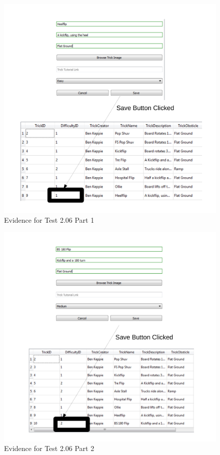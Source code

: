 \begin{figure}[H]
    \includegraphics[width=\textwidth]{./Testing/AnnotatedSamples/Test206p1.pdf}
    \caption{Evidence for Test 2.06 Part 1} \label{fig:Test 2.06 p1}
\end{figure}

\begin{figure}[H]
    \includegraphics[width=\textwidth]{./Testing/AnnotatedSamples/Test206p2.pdf}
    \caption{Evidence for Test 2.06 Part 2} \label{fig:Test 2.06 p2}
\end{figure}

